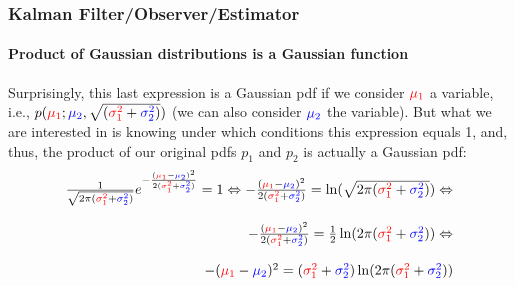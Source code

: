 \begin{frame}[plain]\pw\Large
\frametitle{Kalman Filter/Observer/Estimator}
\framesubtitle{Product of Gaussian distributions is a Gaussian function}


\scriptsize
Surprisingly, this last expression is a Gaussian pdf if we consider ${\color{red}\mu_1}$ a variable, i.e., $p({\color{red}\mu_1}; {\color{blue}\mu_2}, \sqrt{({\color{red}\sigma^2_1}+{\color{blue}\sigma^2_2})})$ (we can also consider ${\color{blue}\mu_2}$ the variable). But what we are interested in is knowing under which conditions this expression equals 1, and, thus, the product of our original pdfs $p_1$ and $p_2$ is actually a Gaussian pdf:
\begin{equation*}
\begin{array}{rlllllll}
\frac {1}{ \sqrt{2 \pi ({\color{red}\sigma^2_1} + {\color{blue}\sigma^2_2})} }   e^{- \frac { ({{\color{red}\mu_1}} - {{\color{blue}\mu_2}} )^2 }{ 2({\color{red}\sigma^2_1} + {\color{blue}\sigma^2_2}) } } = 1  \Leftrightarrow    - \frac { ({{\color{red}\mu_1}} - {{\color{blue}\mu_2}} )^2 }{ 2({\color{red}\sigma^2_1} + {\color{blue}\sigma^2_2}) }   = \ln ( \sqrt{2 \pi ({\color{red}\sigma^2_1} + {\color{blue}\sigma^2_2})} )  \Leftrightarrow\\\\
- \frac { ({{\color{red}\mu_1}} - {{\color{blue}\mu_2}} )^2 }{ 2({\color{red}\sigma^2_1} + {\color{blue}\sigma^2_2}) }   = \frac {1}{2} \ln ( 2 \pi ({\color{red}\sigma^2_1} + {\color{blue}\sigma^2_2}) )  \Leftrightarrow\\\\
-  ({{\color{red}\mu_1}} - {{\color{blue}\mu_2}} )^2    = ({\color{red}\sigma^2_1} + {\color{blue}\sigma^2_2}) \ln ( 2 \pi ({\color{red}\sigma^2_1} + {\color{blue}\sigma^2_2}) ) 
\end{array}
\end{equation*}

\end{frame}




